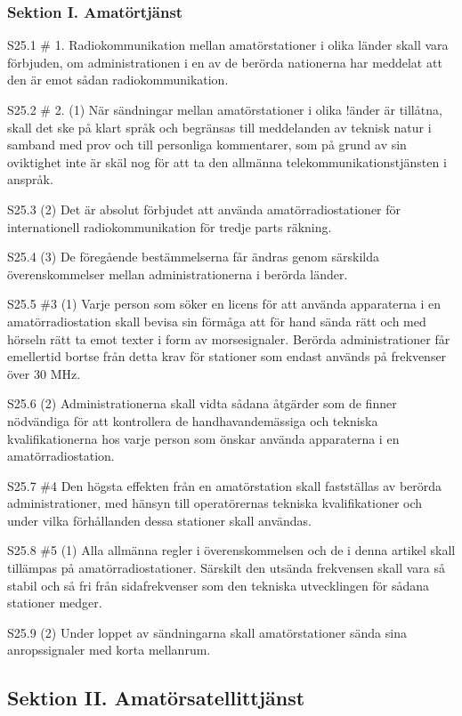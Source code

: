 \subsubsection{Sektion I. Amatörtjänst}
S25.1 \# 1. Radiokommunikation mellan amatörstationer i olika länder
skall vara förbjuden, om administrationen i en av de berörda
nationerna har meddelat att den är emot sådan radiokommunikation.

S25.2 \# 2. (1) När sändningar mellan amatörstationer i olika !änder är
tillåtna, skall det ske på klart språk och begränsas till meddelanden
av teknisk natur i samband med prov och till personliga kommentarer,
som på grund av sin oviktighet inte är skäl nog för att ta den
allmänna telekommunikationstjänsten i anspråk.

S25.3 (2) Det är absolut förbjudet att använda amatörradiostationer
för internationell radiokommunikation för tredje parts räkning.

S25.4 (3) De föregående bestämmelserna får ändras genom särskilda
överenskommelser mellan administrationerna i berörda länder.

S25.5 \#3 (1) Varje person som söker en licens för att använda
apparaterna i en amatörradiostation skall bevisa sin förmåga att för
hand sända rätt och med hörseln rätt ta emot texter i form av
morsesignaler. Berörda administrationer får emellertid bortse från
detta krav för stationer som endast används på frekvenser över 30 MHz.

S25.6 (2) Administrationerna skall vidta sådana åtgärder som de finner
nödvändiga för att kontrollera de handhavandemässiga och tekniska
kvalifikationerna hos varje person som önskar använda apparaterna i en
amatörradiostation.

S25.7 \#4 Den högsta effekten från en amatörstation skall fastställas
av berörda administrationer, med hänsyn till operatörernas tekniska
kvalifikationer och under vilka förhållanden dessa stationer skall
användas.

S25.8 \#5 (1) Alla allmänna regler i överenskommelsen och de i denna
artikel skall tillämpas på amatörradiostationer. Särskilt den utsända
frekvensen skall vara så stabil och så fri från sidafrekvenser som den
tekniska utvecklingen för sådana stationer medger.

S25.9 (2) Under loppet av sändningarna skall amatörstationer sända
sina anropssignaler med korta mellanrum.

\subsection{Sektion II. Amatörsatellittjänst}

